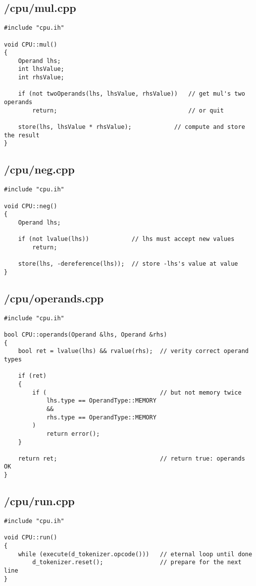 \documentclass{article}
\begin{document}
\subsection*{/cpu/mul.cpp}
\begin{verbatim}
#include "cpu.ih"

void CPU::mul()
{
    Operand lhs;
    int lhsValue;
    int rhsValue;

    if (not twoOperands(lhs, lhsValue, rhsValue))   // get mul's two operands
        return;                                     // or quit

    store(lhs, lhsValue * rhsValue);            // compute and store the result
}
\end{verbatim}
\subsection*{/cpu/neg.cpp}
\begin{verbatim}
#include "cpu.ih"

void CPU::neg()
{
    Operand lhs;

    if (not lvalue(lhs))            // lhs must accept new values
        return;

    store(lhs, -dereference(lhs));  // store -lhs's value at value
}
\end{verbatim}
\subsection*{/cpu/operands.cpp}
\begin{verbatim}
#include "cpu.ih"

bool CPU::operands(Operand &lhs, Operand &rhs)
{
    bool ret = lvalue(lhs) && rvalue(rhs);  // verity correct operand types

    if (ret)
    {
        if (                                // but not memory twice
            lhs.type == OperandType::MEMORY 
            && 
            rhs.type == OperandType::MEMORY
        )
            return error();
    }

    return ret;                             // return true: operands OK
}
\end{verbatim}
\subsection*{/cpu/run.cpp}
\begin{verbatim}
#include "cpu.ih"

void CPU::run()
{
    while (execute(d_tokenizer.opcode()))   // eternal loop until done
        d_tokenizer.reset();                // prepare for the next line
}
\end{verbatim}
\end{document}
